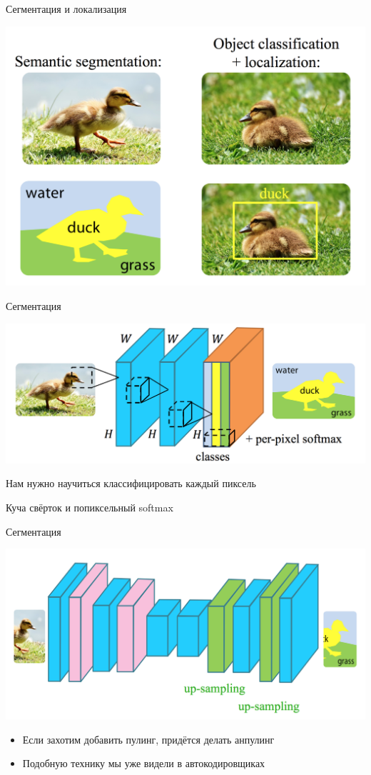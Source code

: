 \documentclass[notes,12pt, aspectratio=169]{beamer}
\newenvironment{wideitemize}{\itemize\addtolength{\itemsep}{10pt}}{\enditemize}
\begin{document}
\begin{frame}{Сегментация и локализация}
\begin{center}
	\includegraphics[width=.7\linewidth]{duck.png}
\end{center}
\end{frame}


\begin{frame}{Сегментация}
\begin{center}
\includegraphics[width=.9\linewidth]{duck_1.png}
\end{center}
\begin{wideitemize}
\item Нам нужно научиться классифицировать каждый пиксель
\item Куча свёрток и попиксельный softmax 
\end{wideitemize}
\end{frame}


\begin{frame}{Сегментация}
\begin{center}
\includegraphics[width=.8\linewidth]{duck_2.png}
\end{center}
\begin{itemize}
\item Если захотим добавить пулинг, придётся делать анпулинг
\item Подобную технику мы уже видели в автокодировщиках 
\end{itemize}
\end{frame}
\end{document}
